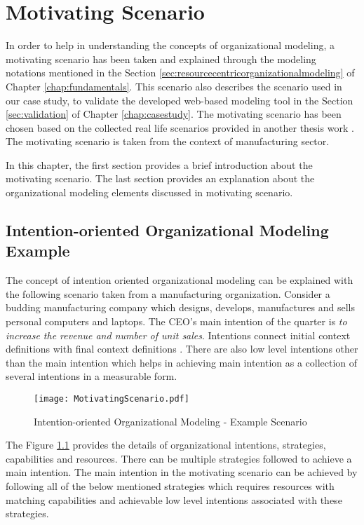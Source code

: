 \chapter{Motivating Scenario}
\label{chap:motivatingScenario}
In order to help in understanding the concepts of organizational modeling, a motivating scenario has been taken and explained through the modeling notations mentioned in the Section \ref{sec:resourcecentricorganizationalmodeling} of Chapter \ref{chap:fundamentals}. This scenario also describes the scenario used in our case study, to validate the developed web-based modeling tool in the Section \ref{sec:validation} of Chapter \ref{chap:casestudy}. The motivating scenario has been chosen based on the collected real life scenarios provided in another thesis work \cite{Sierr2015}. The motivating scenario is taken from the context of manufacturing sector. 

In this chapter, the first section provides a brief introduction about the motivating scenario. The last section provides an explanation about the organizational modeling elements discussed in motivating scenario. 
\section{Intention-oriented Organizational Modeling Example}
\label{sec:scenario}
 The concept of intention oriented organizational modeling can be explained with the following scenario taken from a manufacturing organization. Consider a budding manufacturing company which designs, develops, manufactures and sells personal computers and laptops. The CEO's main intention of the quarter is \textit{to increase the revenue and number of unit sales}. Intentions connect initial context definitions with final context definitions \cite{Sungur2014a}. There are also low level intentions other than the main intention which helps in achieving main intention as a collection of several intentions in a measurable form. 
 
  \begin{figure}
  	\centering
  	\texttt{[image: MotivatingScenario.pdf]}
  	\caption{Intention-oriented Organizational Modeling - Example Scenario}
  	\label{fig:motivatingscenario}
  \end{figure}
  
The Figure \ref{fig:motivatingscenario} provides the details of organizational intentions, strategies, capabilities and resources. There can be multiple strategies followed to achieve a main intention. The main intention in the motivating scenario can be achieved by following all of the below mentioned strategies which requires resources with matching capabilities and achievable low level intentions associated with these strategies. 
 
